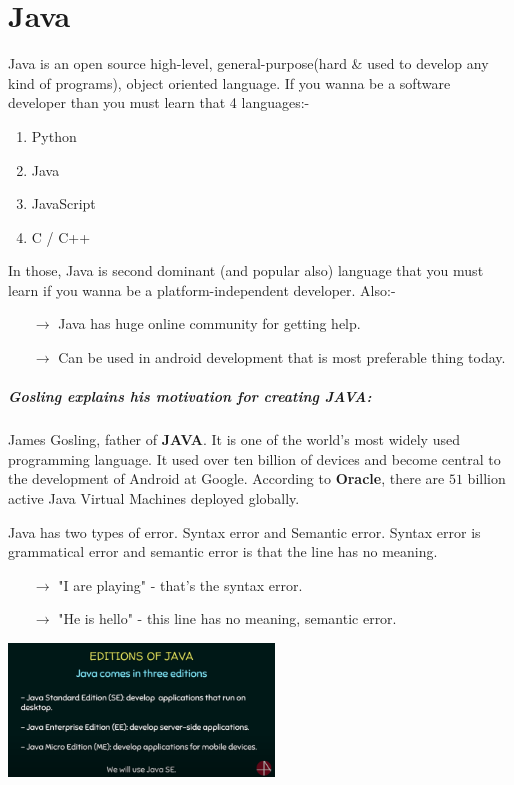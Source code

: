 \documentclass[10 pt]{book}
\begin{document}
\chapter{Java}
Java is an open source high-level, general-purpose(hard \& used to develop any kind of programs), object oriented language. If you wanna be a software developer than you must learn that 4 languages:-
\begin{enumerate}
	\item Python
	\item Java
	\item JavaScript
	\item C / C++
\end{enumerate}
In those, Java is second dominant (and popular also) language that you must learn if you wanna be a platform-independent developer. Also:-
\begin{itemize}
	\item[$\rightarrow$] Java has huge online community for getting help.
	\item[$\rightarrow$] Can be used in android development that is most preferable thing today.
\end{itemize}

\paragraph{Gosling explains his motivation for creating \textbf{JAVA}:}
James Gosling, father of \textbf{JAVA}. It is one of the world's most widely used programming language. It used over ten billion of devices and become central to the development of Android at Google. According to \textbf{Oracle}, there are $51$ billion active Java Virtual Machines deployed globally.

Java has two types of error. Syntax error and Semantic error. Syntax error is grammatical error and semantic error is that the line has no meaning.
\begin{itemize}
	\item[$\rightarrow$] "I are playing" - that's the syntax error.
	\item[$\rightarrow$] "He is hello" - this line has no meaning, semantic error.
\end{itemize} %
\begin{center}
	\includegraphics[width=200pt]{Editions of Java.png}
\end{center}
\end{document}
